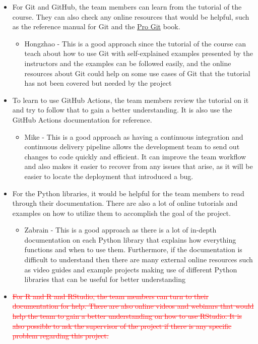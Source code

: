 \documentclass[12pt, titlepage]{article}
\begin{document}
\begin{itemize}
\begin{itemize}
    \end{itemize}
    \item For Git and GitHub, the team members can learn from the tutorial of the course. They can also check any online resources that would be helpful, such as the reference manual for Git and the \href{https://git-scm.com/book/en/v2}{Pro Git} book.
    \begin{itemize}
        \item Hongzhao - This is a good approach since the tutorial of the course can teach about how to use Git with self-explained examples presented by the instructors and the examples can be followed easily, and the online resources about Git could help on some use cases of Git that the tutorial has not been covered but needed by the project
    \end{itemize}
    \item To learn to use GitHub Actions, the team members review the tutorial on it and try to follow that to gain a better understanding. It is also use the GitHub Actions documentation for reference.
    \begin{itemize}
    \item Mike - This is a good approach as having a continuous integration and continuous delivery pipeline allows the development team to send out changes to code quickly and efficient. It can improve the team workflow and also makes it easier to recover from any issues that arise, as it will be easier to locate the deployment that introduced a bug.
    \end{itemize}
    \item For the Python libraries, it would be helpful for the team members to read through their documentation. There are also a lot of online tutorials and examples on how to utilize them to accomplish the goal of the project.
    \begin{itemize}
        \item Zabrain - This is a good approach as there is a lot of in-depth documentation on each Python library that explains how everything functions and when to use them. Furthermore, if the documentation is difficult to understand then there are many external online resources such as video guides and example projects making use of different Python libraries that can be useful for better understanding
    \end{itemize}
    \item \textcolor{red}{\sout{For R and R and RStudio, the team members can turn to their documentation for help. There are also online videos and webinars that would help the team to gain a better understanding on how to use RStudio. It is also possible to ask the supervisor of the project if there is any specific problem regarding this project.}}

\end{itemize}
\end{document}
